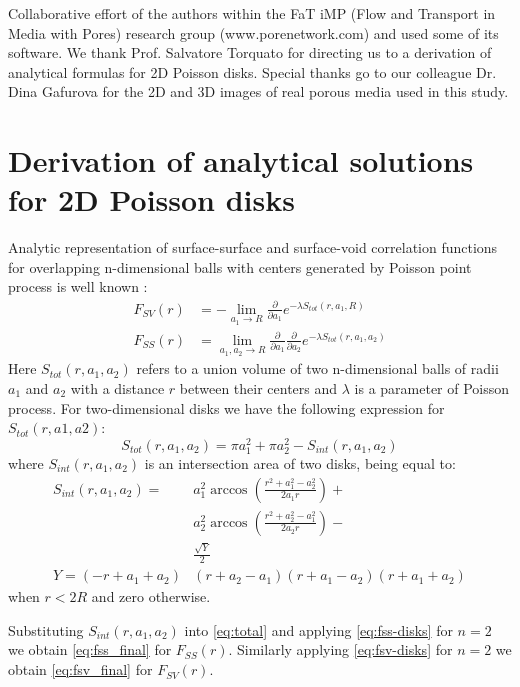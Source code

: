 \documentclass[reprint,amsmath,amssymb,aps,pre,showkeys,showpacs]{revtex4-1}
\begin{document}
Collaborative effort of the authors within the FaT iMP (Flow and Transport in
Media with Pores) research group (www.porenetwork.com) and used some of its
software. We thank Prof. Salvatore Torquato for directing us to a
derivation of analytical formulas for 2D Poisson disks. Special thanks go to
our colleague Dr. Dina Gafurova for the 2D and 3D images of real porous media
used in this study.

\appendix
\section{Derivation of analytical solutions for 2D Poisson disks}
\label{ap:overlapping-disks}
Analytic representation of surface-surface and surface-void correlation
functions for overlapping n-dimensional balls with centers generated by Poisson
point process is well known \cite{Torquato_book}:
\begin{align}
  F_{SV}(r) &= -\lim_{a_1 \rightarrow R} \frac{\partial}{\partial a_1}
  e^{-\lambda S_{tot}(r, a_1, R)} \label{eq:fsv-disks} \\
  F_{SS}(r) &= \lim_{a_1, a_2 \rightarrow R} \frac{\partial}{\partial a_1}
  \frac{\partial}{\partial a_2} e^{-\lambda S_{tot}(r, a_1,
    a_2)} \label{eq:fss-disks}
\end{align}
Here $S_{tot}(r, a_1, a_2)$ refers to a union volume of two n-dimensional balls
of radii $a_1$ and $a_2$ with a distance $r$ between their centers and $\lambda$
is a parameter of Poisson process. For two-dimensional disks we have the
following expression for $S_{tot}(r, a1, a2)$:
\begin{equation}
  S_{tot}(r, a_1, a_2) = \pi a_1^2 + \pi a_2^2 - S_{int}(r, a_1, a_2) \label{eq:total}
\end{equation}
where $S_{int}(r, a_1, a_2)$ is an intersection area of two disks, being equal
to:
\begin{align*}
  S_{int}(r, a_1, a_2) =&  a_1^2 \arccos(\frac{r^2+a_1^2-a_2^2}{2a_1r}) + \\
  & a_2^2 \arccos(\frac{r^2+a_2^2-a_1^2}{2a_2r}) - \\
  & \frac{\sqrt{Y}}{2} \\
  Y = (-r+a_1+a_2)&(r+a_2-a_1)(r+a_1-a_2)(r+a_1+a_2)
\end{align*}
when $r<2R$ and zero otherwise.

Substituting $S_{int}(r, a_1, a_2)$ into \cref{eq:total} and applying
\cref{eq:fss-disks} for $n=2$ we obtain \cref{eq:fss_final} for $F_{SS}(r)$.
Similarly applying \cref{eq:fsv-disks} for $n = 2$ we obtain \cref{eq:fsv_final}
for $F_{SV}(r)$.
\end{document}
